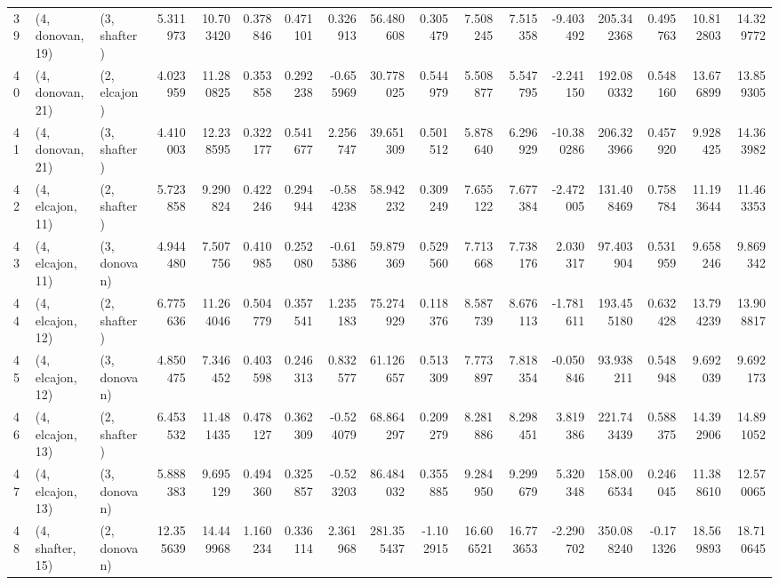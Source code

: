 \begin{tabular}{lllrrrrrrrrrrrrrr}
39 &  (4, donovan, 19) &     (3, shafter) &   5.311973 &  10.703420 &   0.378846 &  0.471101 &   0.326913 &   56.480608 &  0.305479 &   7.508245 &   7.515358 &  -9.403492 &   205.342368 &  0.495763 &  10.812803 &  14.329772 \\
40 &  (4, donovan, 21) &     (2, elcajon) &   4.023959 &  11.280825 &   0.353858 &  0.292238 &  -0.655969 &   30.778025 &  0.544979 &   5.508877 &   5.547795 &  -2.241150 &   192.080332 &  0.548160 &  13.676899 &  13.859305 \\
41 &  (4, donovan, 21) &     (3, shafter) &   4.410003 &  12.238595 &   0.322177 &  0.541677 &   2.256747 &   39.651309 &  0.501512 &   5.878640 &   6.296929 & -10.380286 &   206.323966 &  0.457920 &   9.928425 &  14.363982 \\
42 &  (4, elcajon, 11) &     (2, shafter) &   5.723858 &   9.290824 &   0.422246 &  0.294944 &  -0.584238 &   58.942232 &  0.309249 &   7.655122 &   7.677384 &  -2.472005 &   131.408469 &  0.758784 &  11.193644 &  11.463353 \\
43 &  (4, elcajon, 11) &     (3, donovan) &   4.944480 &   7.507756 &   0.410985 &  0.252080 &  -0.615386 &   59.879369 &  0.529560 &   7.713668 &   7.738176 &   2.030317 &    97.403904 &  0.531959 &   9.658246 &   9.869342 \\
44 &  (4, elcajon, 12) &     (2, shafter) &   6.775636 &  11.264046 &   0.504779 &  0.357541 &   1.235183 &   75.274929 &  0.118376 &   8.587739 &   8.676113 &  -1.781611 &   193.455180 &  0.632428 &  13.794239 &  13.908817 \\
45 &  (4, elcajon, 12) &     (3, donovan) &   4.850475 &   7.346452 &   0.403598 &  0.246313 &   0.832577 &   61.126657 &  0.513309 &   7.773897 &   7.818354 &  -0.050846 &    93.938211 &  0.548948 &   9.692039 &   9.692173 \\
46 &  (4, elcajon, 13) &     (2, shafter) &   6.453532 &  11.481435 &   0.478127 &  0.362309 &  -0.524079 &   68.864297 &  0.209279 &   8.281886 &   8.298451 &   3.819386 &   221.743439 &  0.588375 &  14.392906 &  14.891052 \\
47 &  (4, elcajon, 13) &     (3, donovan) &   5.888383 &   9.695129 &   0.494360 &  0.325857 &  -0.523203 &   86.484032 &  0.355885 &   9.284950 &   9.299679 &   5.320348 &   158.006534 &  0.246045 &  11.388610 &  12.570065 \\
48 &  (4, shafter, 15) &     (2, donovan) &  12.355639 &  14.449968 &   1.160234 &  0.336114 &   2.361968 &  281.355437 & -1.102915 &  16.606521 &  16.773653 &  -2.290702 &   350.088240 & -0.171326 &  18.569893 &  18.710645 \\

\end{tabular}
